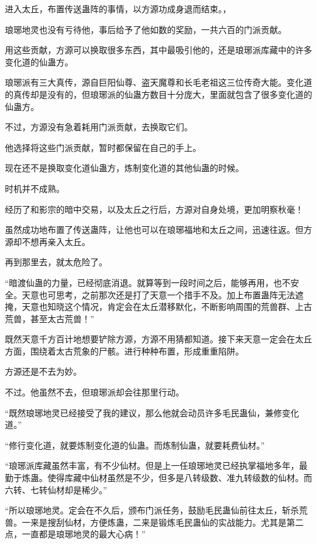 
\begin{this_body}



进入太丘，布置传送蛊阵的事情，以方源功成身退而结束。，

琅琊地灵也没有亏待他，事后给予了他如数的奖励，一共六百的门派贡献。

用这些贡献，方源可以换取很多东西，其中最吸引他的，还是琅琊派库藏中的许多变化道的仙蛊方。

琅琊派有三大真传，源自巨阳仙尊、盗天魔尊和长毛老祖这三位传奇大能。变化道的真传却是没有的，但琅琊派的仙蛊方数目十分庞大，里面就包含了很多变化道的仙蛊方。

不过，方源没有急着耗用门派贡献，去换取它们。

他选择将这些门派贡献，暂时都保留在自己的手上。

现在还不是换取变化道仙蛊方，炼制变化道的其他仙蛊的时候。

时机并不成熟。

经历了和影宗的暗中交易，以及太丘之行后，方源对自身处境，更加明察秋毫！

虽然成功地布置了传送蛊阵，让他也可以在琅琊福地和太丘之间，迅速往返。但方源却不想再亲入太丘。

再到那里去，就太危险了。

“暗渡仙蛊的力量，已经彻底消退。就算等到一段时间之后，能够再用，也不安全。天意也可思考，之前那次还是打了天意一个措手不及。加上布置蛊阵无法遮掩，天意也知晓这个情况，肯定会在太丘潜移默化，不断影响周围的荒兽群、上古荒兽，甚至太古荒兽！”

既然天意千方百计地想要铲除方源，方源不用猜都知道。接下来天意一定会在太丘方面，围绕着太古荒象的尸骸。进行种种布置，形成重重陷阱。

方源还是不去为妙。

不过。他虽然不去，但琅琊派却会往那里行动。

“既然琅琊地灵已经接受了我的建议，那么他就会动员许多毛民蛊仙，兼修变化道。”

“修行变化道，就要炼制变化道的仙蛊。而炼制仙蛊，就要耗费仙材。”

“琅琊派库藏虽然丰富，有不少仙材。但是上一任琅琊地灵已经执掌福地多年，最勤于炼蛊。使得库藏中仙材虽然是不少，但多是八转级数、准九转级数的仙材。而六转、七转仙材却是稀少。”

“所以琅琊地灵。定会在不久后，颁布门派任务，鼓励毛民蛊仙前往太丘，斩杀荒兽。一来是搜刮仙材，方便炼蛊，二来是锻炼毛民蛊仙的实战能力。尤其是第二点，一直都是琅琊地灵的最大心病！”


\end{this_body}
